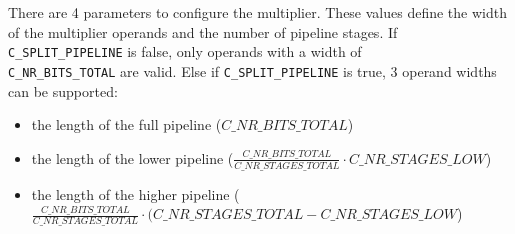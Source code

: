 There are 4 parameters to configure the multiplier. These values define the width of the multiplier operands and the
number of pipeline stages. If \verb|C_SPLIT_PIPELINE| is false, only operands with a width of\\\verb|C_NR_BITS_TOTAL| are
valid. Else if \verb|C_SPLIT_PIPELINE| is true, 3 operand widths can be supported:
\begin{itemize}
  \item the length of the full pipeline ($C\_NR\_BITS\_TOTAL$)
  \item the length of the lower pipeline ($\frac{C\_NR\_BITS\_TOTAL}{C\_NR\_STAGES\_TOTAL} \cdot C\_NR\_STAGES\_LOW $)
  \item the length of the higher pipeline ($\frac{C\_NR\_BITS\_TOTAL}{C\_NR\_STAGES\_TOTAL} \cdot (C\_NR\_STAGES\_TOTAL - C\_NR\_STAGES\_LOW$)
\end{itemize}

